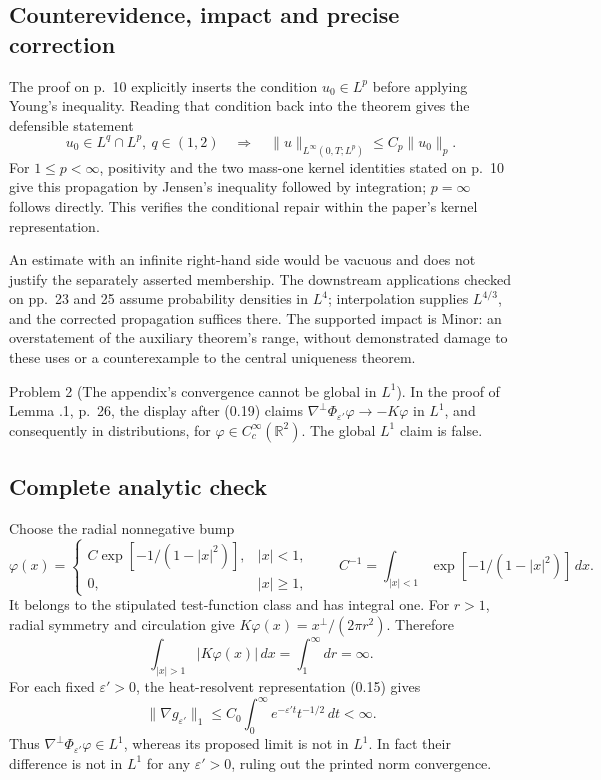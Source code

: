 \documentclass[10pt]{article}
\begin{document}
\subsection*{Counterevidence, impact and precise correction}
The proof on p. 10 explicitly inserts the condition \(u_0\in L^p\) before applying Young’s inequality. Reading that condition back into the theorem gives the defensible statement \[u_0\in L^q\cap L^p,\ q\in(1,2)
 \quad\Longrightarrow\quad
 \|u\|_{L^\infty(0,T;L^p)}\le C_p\|u_0\|_p.\] For \(1\le p<\infty\), positivity and the two mass-one kernel identities stated on p. 10 give this propagation by Jensen’s inequality followed by integration; \(p=\infty\) follows directly. This verifies the conditional repair within the paper’s kernel representation.\par
An estimate with an infinite right-hand side would be vacuous and does not justify the separately asserted membership. The downstream applications checked on pp. 23 and 25 assume probability densities in \(L^4\); interpolation supplies \(L^{4/3}\), and the corrected propagation suffices there. The supported impact is Minor: an overstatement of the auxiliary theorem’s range, without demonstrated damage to these uses or a counterexample to the central uniqueness theorem.\par
Problem 2 (The appendix’s convergence cannot be global in \(L^1\)).  In the proof of Lemma .1, p. 26, the display after (0.19) claims \(\nabla^\perp\Phi_{\varepsilon'}\varphi\to-K\varphi\) in \(L^1\), and consequently in distributions, for \(\varphi\in C_c^\infty(\mathbb R^2)\). The global \(L^1\) claim is false.\par
\subsection*{Complete analytic check}
Choose the radial nonnegative bump \[\varphi(x)=
 \begin{cases}
 C\exp[-1/(1-|x|^2)],&|x|<1,\\
 0,&|x|\ge1,
 \end{cases}
 \qquad C^{-1}=\int_{|x|<1}\exp[-1/(1-|x|^2)]\,dx.\] It belongs to the stipulated test-function class and has integral one. For \(r>1\), radial symmetry and circulation give \(K\varphi(x)=x^\perp/(2\pi r^2)\). Therefore \[\int_{|x|>1}|K\varphi(x)|\,dx=\int_1^\infty dr=\infty.\] For each fixed \(\varepsilon'>0\), the heat-resolvent representation (0.15) gives \[\|\nabla g_{\varepsilon'}\|_1
 \le C_0\int_0^\infty e^{-\varepsilon't}t^{-1/2}\,dt<\infty.\] Thus \(\nabla^\perp\Phi_{\varepsilon'}\varphi\in L^1\), whereas its proposed limit is not in \(L^1\). In fact their difference is not in \(L^1\) for any \(\varepsilon'>0\), ruling out the printed norm convergence.\par
\end{document}
